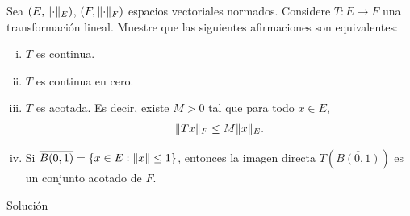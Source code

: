 \begin{homeworkProblem}
  Sea $(E,\lVert\cdot\rVert_{E})$, $(F,\lVert\cdot\rVert_{F})$ espacios vectoriales normados. Considere $T:E\to F$ una transformación lineal. Muestre que las siguientes afirmaciones son equivalentes:
  \begin{enumerate}[(i)]
    \item $T$ es continua.
    \item $T$ es continua en cero.
    \item $T$ es acotada. Es decir, existe $M>0$ tal que para todo $x\in E$,
      \begin{align*}
        \lVert Tx\rVert_{F}\leq M\lVert x\rVert_{E}.
      \end{align*}
    \item Si $\overline{B(0,1)}=\{x\in E:\lVert x\rVert\leq 1\}$, entonces la imagen directa $T\left( \overline{B(0,1)} \right)$ es un conjunto acotado de $F$.
  \end{enumerate}
  \begin{solution}
    Solución
  \end{solution}
\end{homeworkProblem}
